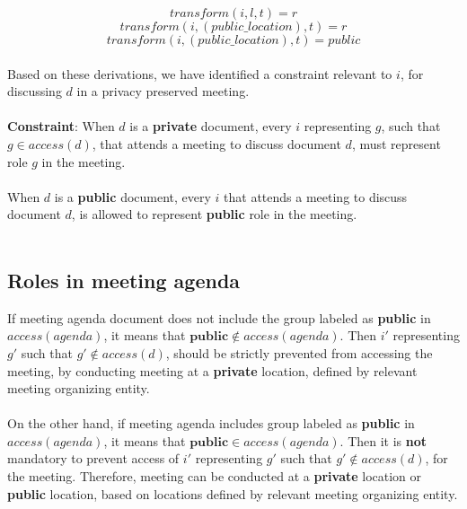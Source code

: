 \documentclass{article}
\begin{document}
\[ transform(i, l, t) = r \]
\[ transform(i, (public\_location), t) = r \]
\[ transform(i, (public\_location), t) = public \] \\
\noindent
Based on these derivations, we have identified a constraint relevant to $i$, for discussing $d$ in a privacy preserved meeting.\\ \\
\textbf{Constraint}: When $d$ is a \textbf{private} document, every $i$ representing $g$, such that $g \in access(d)$, that attends a meeting to discuss document $d$, must represent role $g$ in the meeting.\\ \\
When $d$ is a \textbf{public} document, every $i$ that attends a meeting to discuss document $d$, is allowed to represent \textbf{public} role in the meeting.\\ \\

\subsection{Roles in meeting agenda}
\noindent
If meeting agenda document does not include the group labeled as \textbf{public} in $access(agenda)$, it means that $\textbf{public} \notin access(agenda)$. Then $i'$ representing $g'$ such that $g' \notin access(d)$, should be strictly prevented from accessing the meeting, by conducting meeting at a \textbf{private} location, defined by relevant meeting organizing entity.\\ \\
On the other hand, if meeting agenda includes group labeled as \textbf{public} in $access(agenda)$, it means that $\textbf{public} \in access(agenda)$. Then it is \textbf{not} mandatory to prevent access of $i'$ representing $g'$ such that $g' \notin access(d)$, for the meeting. Therefore, meeting can be conducted at a \textbf{private} location or \textbf{public} location, based on locations defined by relevant meeting organizing entity.\\ \\

\end{document}
